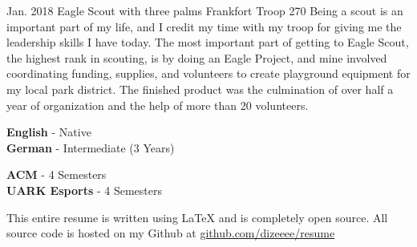 \documentclass[9pt]{developercv} %
\begin{document}

\begin{entrylist}
	\entry
		{Jan. 2018}
		{Eagle Scout with three palms}
		{Frankfort Troop 270}
		{Being a scout is an important part of my life, and I credit my time with my troop for giving me the leadership skills I have today. The most important part of getting to Eagle Scout, the highest rank in scouting, is by doing an Eagle Project, and mine involved coordinating funding, supplies, and volunteers to create playground equipment for my local park district. The finished product was the culmination of over half a year of organization and the help of more than 20 volunteers.}
\end{entrylist}

\begin{minipage}[t]{0.3\textwidth}
	\vspace{-\baselineskip} %

	
	\textbf{English} - Native\\
	\textbf{German} - Intermediate (3 Years)\\
\end{minipage}
\hfill
\begin{minipage}[t]{0.25\textwidth}
	\vspace{-\baselineskip} %
	
	
	\textbf{ACM} - 4 Semesters\\
	\textbf{UARK Esports} - 4 Semesters\\
\end{minipage}
\hfill
\begin{minipage}[t]{0.4\textwidth}
	\vspace{-\baselineskip} %
	
	
	This entire resume is written using LaTeX and is completely open source. All source code is hosted on my Github at \href{https://www.github.com/Dizeeee/resume}{github.com/dizeeee/resume}
\end{minipage}

\end{document}
